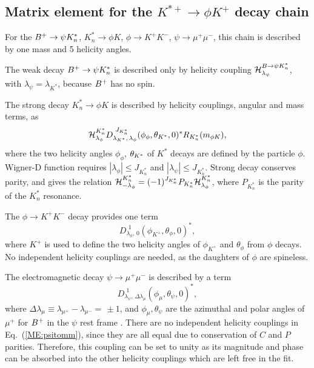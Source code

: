 \subsection{Matrix element for the $K^{*+}\to \phi K^+$ decay chain}
For the ${{{B}^+}}\rightarrow \psi K^*_n$, $K^*_n\to \phi K$, $\phi\to K^+K^-$, $\psi\to\mu^+\mu^-$, 
this chain is described by one mass and 5 helicity angles.

The weak decay ${{{B}^+}}\rightarrow \psi K^*_n$ is described only by helicity coupling ${\cal H}_{\lambda_\psi}^{B\rightarrow \psi K^*_n}$, 
with $\lambda_\psi=\lambda_{K^*}$, 
because ${{{B}^+}}$ has no spin. 

The strong decay $K^*_n\to \phi K$ is described by helicity couplings, 
angular and mass terms, as
\begin{equation}
{\cal H}^{K^*_n}_{\lambda_\phi} D^{\,\,J_{K^*_n}}_{\lambda_{K^*},\,\lambda_\phi}(\phi_\phi,\theta_{K^*},0)^*R_{K^*_n}(m_{\phi K}),
\end{equation}
where the two helicity angles $\phi_\phi$, $\theta_{K^*}$ of  $K^*$ decays are defined by the particle $\phi$. 
Wigner-D function requires $|\lambda_\phi|\le J_{K_n^*}$ and $|\lambda_\psi|\le J_{K_n^*}$. 
Strong decay conserves parity, 
and gives the relation ${\cal H}^{K^*_n}_{-\lambda_\phi}=(-1)^{J_{K_n^*}}P_{K_n^*}{\cal H}^{K^*_n}_{\lambda_\phi}$, 
where $P_{K_n^*}$ is the parity of the $K^*_n$ resonance.

The $\phi\to K^+K^-$ decay provides one term 
\begin{equation}
D^{\,\,1}_{\lambda_{\phi},\,0}(\phi_{K^+},\theta_\phi,0)^*,
\end{equation}
where $K^+$ is used to define the two helicity angles of $\phi_{K^+}$ and $\theta_\phi$ from $\phi$ decays. 
No independent helicity couplings are needed, as the daughters of $\phi$ are spineless.

The electromagnetic decay $\psi\to\mu^+\mu^-$ is described by a term
\begin{equation}
\label{ME:psitomm}
D^{\,\,1}_{\lambda_{\psi},\,\Delta\lambda_\mu}(
\phi_{\mu},\theta_{\psi},0)^*,
\end{equation}
where $\Delta\lambda_{\mu}\equiv\lambda_{\mu^+}-\lambda_{\mu^-}=\,\pm1$,
and $\phi_{\mu},\theta_{\psi}$ are the azimuthal and polar angles of $\mu^+$ for ${{{B}^+}}$ 
in the $\psi$ rest frame .
There are no independent helicity couplings in Eq.~(\ref{ME:psitomm}), since they are all equal due to conservation of $C$ and $P$ parities.
Therefore, this coupling can be set to unity as its magnitude and phase can be absorbed into the other helicity couplings which are left free in the fit.

